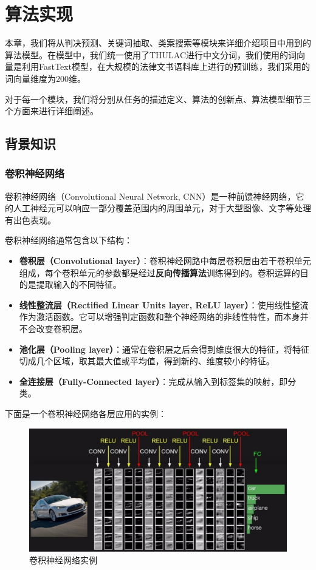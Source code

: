 \chapter{算法实现}
本章，我们将从判决预测、关键词抽取、类案搜索等模块来详细介绍项目中用到的算法模型。在模型中，我们统一使用了THULAC进行中文分词，我们使用的词向量是利用FastText模型，在大规模的法律文书语料库上进行的预训练，我们采用的词向量维度为200维。

对于每一个模块，我们将分别从任务的描述定义、算法的创新点、算法模型细节三个方面来进行详细阐述。

\section{背景知识}
\subsection{卷积神经网络}
卷积神经网络（Convolutional Neural Network, CNN）是一种前馈神经网络，它的人工神经元可以响应一部分覆盖范围内的周围单元，对于大型图像、文字等处理有出色表现。

卷积神经网络通常包含以下结构：

\begin{itemize}
	\item \textbf{卷积层（Convolutional layer）}：卷积神经网路中每层卷积层由若干卷积单元组成，每个卷积单元的参数都是经过\textbf{反向传播算法}训练得到的。卷积运算的目的是提取输入的不同特征。
	\item \textbf{线性整流层（Rectified Linear Units layer, ReLU layer）}：使用线性整流作为激活函数。它可以增强判定函数和整个神经网络的非线性特性，而本身并不会改变卷积层。
	\item \textbf{池化层（Pooling layer）}：通常在卷积层之后会得到维度很大的特征，将特征切成几个区域，取其最大值或平均值，得到新的、维度较小的特征。
	\item \textbf{全连接层（Fully-Connected layer）}：完成从输入到标签集的映射，即分类。
\end{itemize}

下面是一个卷积神经网络各层应用的实例：

\begin{figure}[ht]
    \centering
    \includegraphics[width=\linewidth]{figures/cnn1}
    \caption{卷积神经网络实例}
    \label{fig:cnn1}
\end{figure}

